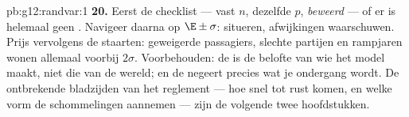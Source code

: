 \begin{solution}{pb:g12:randvar:1}
\textbf{20.} Eerst de checklist --- vast $n$, dezelfde $p$, 
\emph{beweerd} --- of er is helemaal geen . Navigeer daarna
op $\E \pm \sigma$:  situeren, afwijkingen waarschuwen. Prijs
vervolgens de staarten: geweigerde passagiers, slechte partijen en rampjaren
wonen allemaal voorbij $2\sigma$. Voorbehouden: de  is de
belofte van wie het model maakt, niet die van de wereld; en de
 negeert precies wat je ondergang wordt. De ontbrekende
bladzijden van het reglement --- hoe snel  tot rust komen, en welke
vorm de schommelingen aannemen --- zijn de volgende twee hoofdstukken.
\end{solution}
